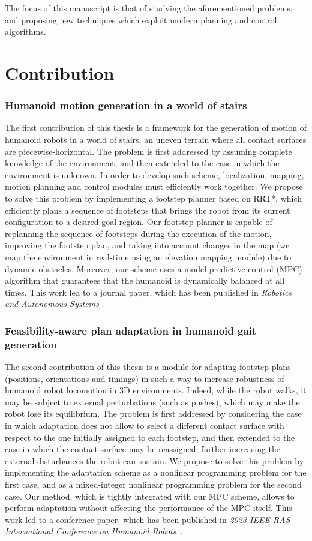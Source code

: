 The focus of this manuscript is that of studying the aforementioned problems,
and proposing new techniques which exploit modern planning and control
algorithms.

\section{Contribution}
\subsubsection{Humanoid motion generation in a world of stairs}
The first contribution of this thesis is a framework for the generation of 
motion of humanoid robots in a world of stairs, an uneven terrain 
where all contact surfaces are piecewise-horizontal. The problem is first 
addressed by assuming complete knowledge of the environment, and then 
extended to the case in which the environment is unknown. In order to 
develop such scheme, localization, mapping, motion planning 
and control modules must efficiently work together. We propose to solve this 
problem by implementing a footstep planner based on RRT*, which efficiently 
plans a sequence of footsteps that brings the robot from its current 
configuration to a desired goal region. Our footstep planner is 
capable of replanning the sequence of footsteps during the execution of the 
motion, improving the footstep plan, and taking into account changes 
in the map (we map the environment in real-time using an elevation mapping 
module) due to dynamic obstacles. Moreover, our scheme
uses a model predictive control (MPC) algorithm that guarantees that the humanoid is
dynamically balanced at all times. This work led to a journal paper, which 
has been published in \textit{Robotics and Autonomous Systems} 
\cite{Cipriano2023RAS}.

\subsubsection{Feasibility-aware plan adaptation in humanoid gait generation}
The second contribution of this thesis is a module for adapting footstep plans 
(positions, orientations and timings) in such a way to increase robustness 
of humanoid robot locomotion in 3D environments.
Indeed, while the robot walks, it may be subject 
to external perturbations (such as pushes), which may make the robot lose its 
equilibrium. The problem is first addressed by considering the case in which 
adaptation does not allow to select a different contact surface with respect
to the one initially assigned to each footstep, and then extended to the case 
in which the contact surface may be reassigned, further increasing the external 
disturbances the robot can sustain. We propose to solve this problem by 
implementing the adaptation scheme as a nonlinear programming problem for the
first case, and as a mixed-integer nonlinear programming problem for the
second case. Our method, which is tightly integrated with our MPC scheme,
allows to perform adaptation without affecting the performance of the MPC
itself. This work led to a conference paper, which has been published 
in \textit{2023 IEEE-RAS International Conference on Humanoid
Robots}~\cite{Cipriano2023Humanoids}.

